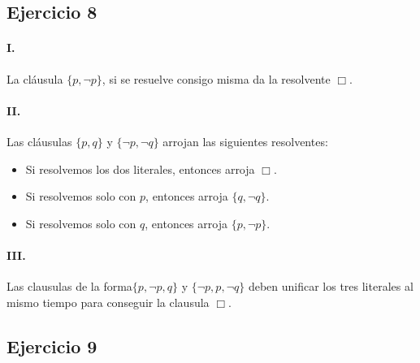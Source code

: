 \documentclass[10pt,a4paper]{article}
\begin{document}
\subsection{Ejercicio 8}
\paragraph{I.} La cláusula $\{p,\lnot p\}$, si se resuelve consigo misma da la resolvente $\Box$.
\paragraph{II.} Las cláusulas $\{p,q\}$ y $\{\lnot p, \lnot q\}$ arrojan las siguientes resolventes:
\begin{itemize}
    \item Si resolvemos los dos literales, entonces arroja $\Box$.
    \item Si resolvemos solo con $p$, entonces arroja $\{q,\lnot q\}$.
    \item Si resolvemos solo con $q$, entonces arroja $\{p,\lnot p\}$.
\end{itemize}
\paragraph{III.} Las clausulas de la forma$\{p,\lnot p, q\}$ y $\{\lnot p, p,\lnot q\}$ deben unificar los tres literales al mismo tiempo para conseguir la clausula $\Box$.

\subsection{Ejercicio 9}
\end{document}
